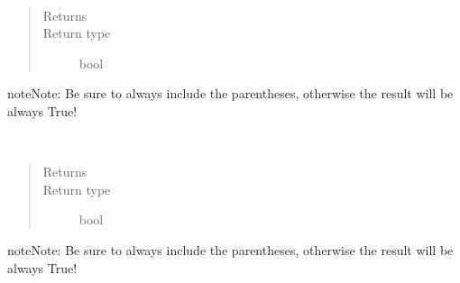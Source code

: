 \documentclass[letterpaper,10pt,english]{sphinxmanual}
\begin{document}
\begin{fulllineitems}
\begin{fulllineitems}
\end{fulllineitems}


\begin{fulllineitems}
\label{\detokenize{Reference:salabim.Component.isrequesting}}~\begin{quote}\begin{description}
\item[{Returns}] \leavevmode
{}

\item[{Return type}] \leavevmode
bool

\end{description}\end{quote}

\begin{sphinxadmonition}{note}{Note:}
Be sure to always include the parentheses, otherwise the result will be always True!
\end{sphinxadmonition}

\end{fulllineitems}


\begin{fulllineitems}
\label{\detokenize{Reference:salabim.Component.isscheduled}}~\begin{quote}\begin{description}
\item[{Returns}] \leavevmode
{}

\item[{Return type}] \leavevmode
bool

\end{description}\end{quote}

\begin{sphinxadmonition}{note}{Note:}
Be sure to always include the parentheses, otherwise the result will be always True!
\end{sphinxadmonition}

\end{fulllineitems}



\end{fulllineitems}
\end{document}
